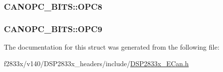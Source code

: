 \subsubsection[{O\+P\+C8}]{ C\+A\+N\+O\+P\+C\+\_\+\+B\+I\+T\+S\+::\+O\+P\+C8}\label{struct_c_a_n_o_p_c___b_i_t_s_a593ef6f63e734a94a9a85559148408bc}
\hypertarget{struct_c_a_n_o_p_c___b_i_t_s_a16593fd2b127e38ccd10ebdc9b22ea8c}{}
\subsubsection[{O\+P\+C9}]{ C\+A\+N\+O\+P\+C\+\_\+\+B\+I\+T\+S\+::\+O\+P\+C9}\label{struct_c_a_n_o_p_c___b_i_t_s_a16593fd2b127e38ccd10ebdc9b22ea8c}


The documentation for this struct was generated from the following file\+:\begin{DoxyCompactItemize}
\item 
f2833x/v140/\+D\+S\+P2833x\+\_\+headers/include/\hyperlink{_d_s_p2833x___e_can_8h}{D\+S\+P2833x\+\_\+\+E\+Can.\+h}\end{DoxyCompactItemize}
